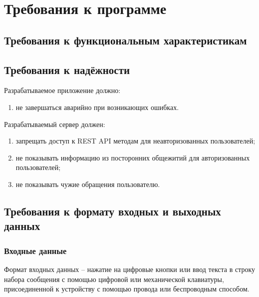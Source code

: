 \section{Требования к программе}

\subsection{Требования к функциональным характеристикам}



\subsection{Требования к надёжности}

Разрабатываемое приложение должно:

\begin{enumerate}
    \item не завершаться аварийно при возникающих ошибках.
\end{enumerate}

Разрабатываемый сервер должен:

\begin{enumerate}
    \item запрещать доступ к REST API методам для неавторизованных пользователей;
    \item не показывать информацию из посторонних общежитий для авторизованных пользователей;
    \item не показывать чужие обращения пользователю.
\end{enumerate}


%

\subsection{Требования к формату входных и выходных данных}

\subsubsection{Входные данные}

Формат входных данных -- нажатие на цифровые кнопки или ввод текста в строку набора сообщения с помощью цифровой или механической клавиатуры, присоединенной к устройству с помощью провода или беспроводным способом.

